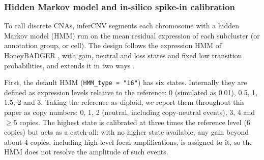 \subsubsection{Hidden Markov model and in-silico spike-in calibration}

To call discrete CNAs, inferCNV segments each chromosome with a hidden Markov model (HMM) run on the mean residual expression of each subcluster (or annotation group, or cell). The design follows the expression HMM of HoneyBADGER \citep{fan2018}, with gain, neutral and loss states and fixed low transition probabilities, and extends it in two ways \citep{haas2021thesis}.

First, the default HMM (\texttt{HMM\_type\ =\ "i6"}) has six states. Internally they are defined as expression levels relative to the reference: 0 (simulated as 0.01), 0.5, 1, 1.5, 2 and 3. Taking the reference as diploid, we report them throughout this paper as copy numbers: 0, 1, 2 (neutral, including copy-neutral events), 3, 4 and $\geq$5 copies. The highest state is calibrated at three times the reference level (6 copies) but acts as a catch-all: with no higher state available, any gain beyond about 4 copies, including high-level focal amplifications, is assigned to it, so the HMM does not resolve the amplitude of such events.

